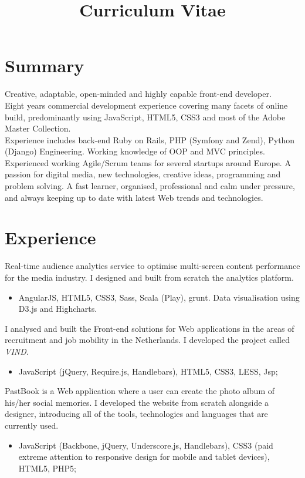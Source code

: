 \documentclass[11pt,a4paper]{moderncv-mod}
\title{Curriculum Vitae}               %
\begin{document}
\maketitle

\section{Summary}
Creative, adaptable, open-minded and highly capable front-end developer. \\Eight years commercial development experience covering many facets of online build, predominantly using JavaScript, HTML5, CSS3 and most of the Adobe Master Collection. \\Experience includes back-end Ruby on Rails, PHP (Symfony and Zend), Python (Django) Engineering.
Working knowledge of OOP and MVC principles. \\ Experienced working Agile/Scrum teams for several startups around Europe. A passion for digital media, new technologies, creative ideas, programming and problem solving. A fast learner, organised, professional and calm under pressure, and always keeping up to date with latest Web trends and technologies.

\section{Experience}

{Real-time audience analytics service to optimise multi-screen content performance for the media industry. I designed and built from scratch the analytics platform.
\begin{itemize}%
\item AngularJS, HTML5, CSS3, Sass, Scala (Play), grunt. Data visualisation using D3.js and Highcharts.
\end{itemize}%
}

{I analysed and built the Front-end solutions for Web applications in the areas of recruitment and job mobility in the Netherlands. I developed the project called \emph{VIND}.
\begin{itemize}%
\item JavaScript (jQuery, Require.js, Handlebars), HTML5, CSS3, LESS, Jsp;
\end{itemize}%
}

{PastBook is a Web application where a user can create the photo album of his/her social memories.
I developed the website from scratch alongside a designer, introducing all of the tools, technologies and languages that are currently used.
\begin{itemize}%
\item JavaScript (Backbone, jQuery, Underscore.js, Handlebars), CSS3 (paid extreme attention to responsive design for mobile and tablet devices), HTML5, PHP5;
\end{itemize}%
}
\end{document}
